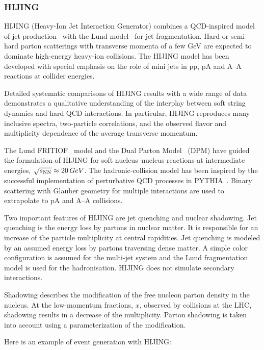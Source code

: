 \documentclass[12pt,a4paper,twoside]{article}
\begin{document}
\subsubsection{HIJING}
HIJING (Heavy-Ion Jet Interaction Generator) combines a
QCD-inspired model of jet production~\cite{MC:HIJING} with the
Lund model~\cite{MC:LUND} for jet fragmentation.  Hard or
semi-hard parton scatterings with transverse momenta of a few GeV
are expected to dominate high-energy heavy-ion collisions.  The
HIJING model has been developed with special emphasis on the role
of mini jets in pp, pA and A--A reactions at collider energies.

Detailed systematic comparisons of HIJING results with a wide
range of data demonstrates a qualitative understanding of the
interplay between soft string dynamics and hard QCD interactions.
In particular, HIJING reproduces many inclusive spectra,
two-particle correlations, and the observed flavor and
multiplicity dependence of the average transverse momentum.

The Lund FRITIOF~\cite{MC:FRITIOF} model and the Dual Parton
Model~\cite{MC:DPM} (DPM) have guided the formulation of HIJING
for soft nucleus--nucleus reactions at intermediate energies,
$\sqrt{s_{\rm NN}}\approx 20\, GeV$.  The hadronic-collision
model has been inspired by the successful implementation of
perturbative QCD processes in PYTHIA~\cite{MC:PYTH}.  Binary
scattering with Glauber geometry for multiple interactions are
used to extrapolate to pA and A--A collisions.

Two important features of HIJING are jet quenching and nuclear
shadowing. Jet quenching is the energy loss by partons in nuclear
matter.  It is responsible for an increase of the particle
multiplicity at central rapidities.  Jet quenching is modeled by an
assumed energy loss by partons traversing dense matter.  A simple
color configuration is assumed for the multi-jet system and the Lund
fragmentation model is used for the hadronisation.  HIJING does not
simulate secondary interactions.

Shadowing describes the modification of the free nucleon parton
density in the nucleus.  At the low-momentum fractions, $x$,
observed by collisions at the LHC, shadowing results in a decrease
of the multiplicity. Parton shadowing is taken into account using
a parameterization of the modification.

Here is an example of event generation with HIJING:
\end{document}
